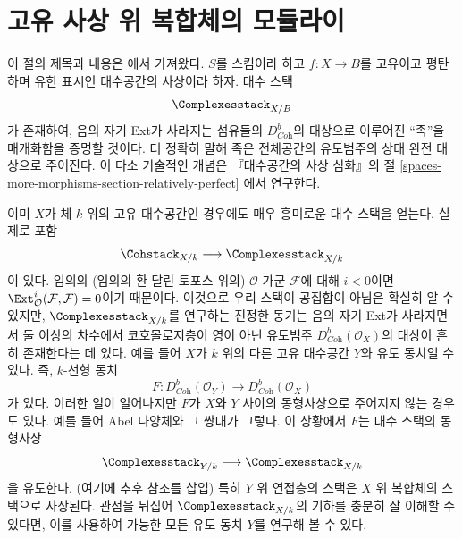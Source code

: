 \section{고유 사상 위 복합체의 모듈라이}
\label{section-moduli-complexes}

\noindent
이 절의 제목과 내용은 \cite{lieblich-complexes}에서 가져왔다. $S$를 스킴이라
하고 $f : X \to B$를 고유이고 평탄하며 유한 표시인 대수공간의 사상이라 하자.
대수 스택
$$
\Complexesstack_{X/B}
$$
가 존재하여, 음의 자기 Ext가 사라지는 섬유들의 $D^b_{\textit{Coh}}$의
대상으로 이루어진 ``족''을 매개화함을 증명할 것이다. 더 정확히 말해 족은
전체공간의 유도범주의 상대 완전 대상으로 주어진다. 이 다소 기술적인 개념은
『대수공간의 사상 심화』의 절
\ref{spaces-more-morphisms-section-relatively-perfect}
에서 연구한다.

\medskip\noindent
이미 $X$가 체 $k$ 위의 고유 대수공간인 경우에도 매우 흥미로운 대수 스택을
얻는다. 실제로 포함
$$
\Cohstack_{X/k} \longrightarrow \Complexesstack_{X/k}
$$
이 있다. 임의의 (임의의 환 달린 토포스 위의) $\mathcal{O}$-가군
$\mathcal{F}$에 대해 $i < 0$이면
$\Ext^i_\mathcal{O}(\mathcal{F}, \mathcal{F}) = 0$이기 때문이다. 이것으로 우리
스택이 공집합이 아님은 확실히 알 수 있지만, $\Complexesstack_{X/k}$를 연구하는
진정한 동기는 음의 자기 Ext가 사라지면서 둘 이상의 차수에서 코호몰로지층이
영이 아닌 유도범주 $D^b_{\textit{Coh}}(\mathcal{O}_X)$의 대상이 흔히
존재한다는 데 있다. 예를 들어 $X$가 $k$ 위의 다른 고유 대수공간 $Y$와
유도 동치일 수 있다. 즉, $k$-선형 동치
$$
F : D^b_{\textit{Coh}}(\mathcal{O}_Y)
\longrightarrow
D^b_{\textit{Coh}}(\mathcal{O}_X)
$$
가 있다. 이러한 일이 일어나지만 $F$가 $X$와 $Y$ 사이의 동형사상으로
주어지지 않는 경우도 있다. 예를 들어 Abel 다양체와 그 쌍대가 그렇다.
이 상황에서 $F$는 대수 스택의 동형사상
$$
\Complexesstack_{Y/k}
\longrightarrow
\Complexesstack_{X/k}
$$
을 유도한다.
(여기에 추후 참조를 삽입) 특히 $Y$ 위 연접층의 스택은 $X$ 위 복합체의
스택으로 사상된다. 관점을 뒤집어 $\Complexesstack_{X/k}$의 기하를 충분히
잘 이해할 수 있다면, 이를 사용하여 가능한 모든 유도 동치 $Y$를 연구해 볼 수 있다.

